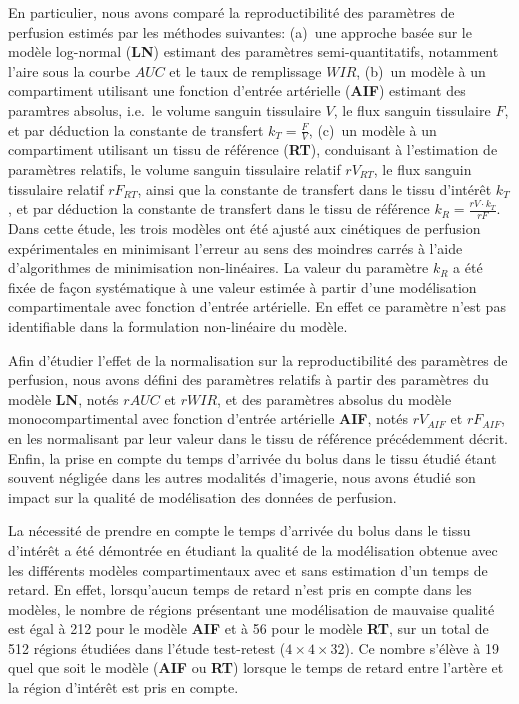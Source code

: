 \begin{otherlanguage}{francais}
En particulier, nous avons compar\'e la reproductibilit\'e des param\`etres de perfusion estim\'es par les m\'ethodes suivantes: (a)~une approche bas\'ee sur le mod\`ele log-normal (\textbf{LN}) estimant des param\`etres semi-quantitatifs, notamment l'aire sous la courbe $AUC$ et le taux de remplissage $WIR$, (b)~un mod\`ele \`a un compartiment utilisant une fonction d'entr\'ee art\'erielle (\textbf{AIF}) estimant des param\`tres absolus, i.e.~le volume sanguin tissulaire $V$, le flux sanguin tissulaire $F$, et par d\'eduction la constante de transfert $k_T = \frac{F}{V}$, (c)~un mod\`ele \`a un compartiment utilisant un tissu de r\'ef\'erence (\textbf{RT}), conduisant \`a l'estimation de param\`etres relatifs, le volume sanguin tissulaire relatif $rV_{RT}$, le flux sanguin tissulaire relatif $rF_{RT}$, ainsi que la constante de transfert dans le tissu d'int\'er\^et $k_{T}$, et par d\'eduction la constante de transfert dans le tissu de r\'ef\'erence $k_R = \frac{rV \cdot k_T}{rF}$.
Dans cette \'etude, les trois mod\`eles ont \'et\'e ajust\'e aux cin\'etiques de perfusion exp\'erimentales en minimisant l'erreur au sens des moindres carr\'es \`a l'aide d'algorithmes de minimisation non-lin\'eaires.
La valeur du param\`etre $k_R$ a \'et\'e fix\'ee de fa\c{c}on syst\'ematique \`a une valeur estim\'ee \`a partir d'une mod\'elisation compartimentale avec fonction d'entr\'ee art\'erielle.
En effet ce param\`etre n'est pas identifiable dans la formulation non-lin\'eaire du mod\`ele.

Afin d'\'etudier l'effet de la normalisation sur la reproductibilit\'e des param\`etres de perfusion, nous avons d\'efini des param\`etres relatifs \`a partir des param\`etres du mod\`ele \textbf{LN}, not\'es $rAUC$ et $rWIR$, et des param\`etres absolus du mod\`ele monocompartimental avec fonction d'entr\'ee art\'erielle \textbf{AIF}, not\'es $rV_{AIF}$ et $rF_{AIF}$, en les normalisant par leur valeur dans le tissu de r\'ef\'erence pr\'ec\'edemment d\'ecrit.
Enfin, la prise en compte du temps d'arriv\'ee du bolus dans le tissu \'etudi\'e \'etant souvent n\'eglig\'ee dans les autres modalit\'es d'imagerie, nous avons \'etudi\'e son impact sur la qualit\'e de mod\'elisation des donn\'ees de perfusion.

La n\'ecessit\'e de prendre en compte le temps d'arriv\'ee du bolus dans le tissu d'int\'er\^et a \'et\'e d\'emontr\'ee en \'etudiant la qualit\'e de la mod\'elisation obtenue avec les diff\'erents mod\`eles compartimentaux avec et sans estimation d'un temps de retard. 
En effet, lorsqu'aucun temps de retard n'est pris en compte dans les mod\`eles, le nombre de r\'egions pr\'esentant une mod\'elisation de mauvaise qualit\'e est \'egal \`a 212 pour le mod\`ele \textbf{AIF} et \`a 56 pour le mod\`ele \textbf{RT}, sur un total de 512 r\'egions \'etudi\'ees dans l'\'etude test-retest ($4 \times 4 \times 32$).
Ce nombre s'\'el\`eve \`a 19 quel que soit le mod\`ele (\textbf{AIF} ou \textbf{RT}) lorsque le temps de retard entre l'art\`ere et la r\'egion d'int\'er\^et est pris en compte.


\end{otherlanguage}
